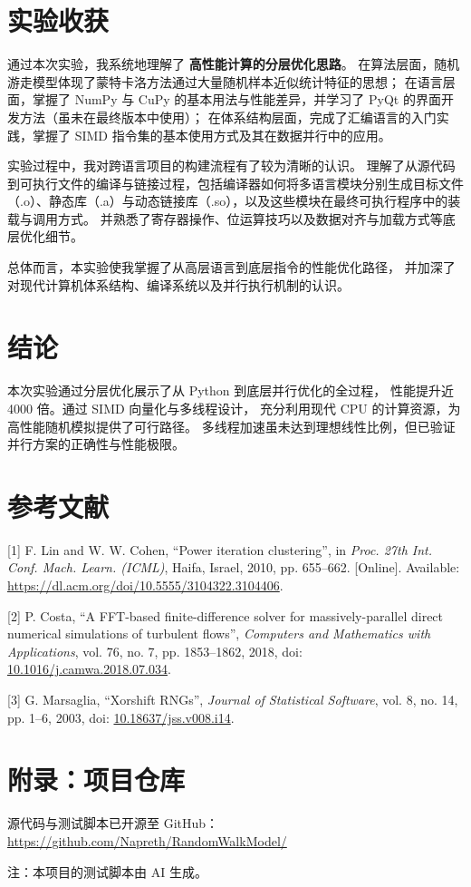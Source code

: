 \documentclass[a4paper,12pt]{article}
\begin{document}
\begin{CJK}{UTF8}{gbsn}
	\section{实验收获}
	通过本次实验，我系统地理解了 \textbf{高性能计算的分层优化思路}。
	在算法层面，随机游走模型体现了蒙特卡洛方法通过大量随机样本近似统计特征的思想；
	在语言层面，掌握了 NumPy 与 CuPy 的基本用法与性能差异，并学习了 PyQt 的界面开发方法（虽未在最终版本中使用）；
	在体系结构层面，完成了汇编语言的入门实践，掌握了 SIMD 指令集的基本使用方式及其在数据并行中的应用。

	实验过程中，我对跨语言项目的构建流程有了较为清晰的认识。
	理解了从源代码到可执行文件的编译与链接过程，包括编译器如何将多语言模块分别生成目标文件（.o）、静态库（.a）与动态链接库（.so），以及这些模块在最终可执行程序中的装载与调用方式。
	并熟悉了寄存器操作、位运算技巧以及数据对齐与加载方式等底层优化细节。

	总体而言，本实验使我掌握了从高层语言到底层指令的性能优化路径，
	并加深了对现代计算机体系结构、编译系统以及并行执行机制的认识。



	\section{结论}
	本次实验通过分层优化展示了从 Python 到底层并行优化的全过程，
	性能提升近 4000 倍。通过 SIMD 向量化与多线程设计，
	充分利用现代 CPU 的计算资源，为高性能随机模拟提供了可行路径。
	多线程加速虽未达到理想线性比例，但已验证并行方案的正确性与性能极限。


	\section{参考文献}
	[1] F. Lin and W. W. Cohen, “Power iteration clustering”, in \textit{Proc. 27th Int. Conf. Mach. Learn. (ICML)}, Haifa, Israel, 2010, pp. 655–662. [Online]. Available: \url{https://dl.acm.org/doi/10.5555/3104322.3104406}.

	[2] P. Costa, “A FFT-based finite-difference solver for massively-parallel direct numerical simulations of turbulent flows”, \textit{Computers and Mathematics with Applications}, vol. 76, no. 7, pp. 1853–1862, 2018, doi: \href{https://doi.org/10.1016/j.camwa.2018.07.034}{10.1016/j.camwa.2018.07.034}.

	[3] G. Marsaglia, “Xorshift RNGs”, \textit{Journal of Statistical Software}, vol. 8, no. 14, pp. 1–6, 2003, doi: \href{https://doi.org/10.18637/jss.v008.i14}{10.18637/jss.v008.i14}.


	\section{附录：项目仓库}
	源代码与测试脚本已开源至 GitHub：
	\url{https://github.com/Napreth/RandomWalkModel/}

	注：本项目的测试脚本由 AI 生成。

\end{CJK}
\end{document}
